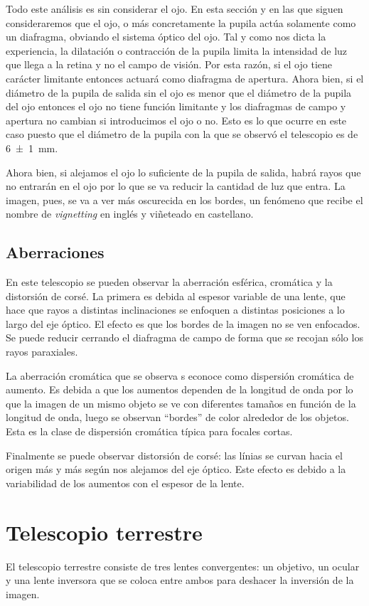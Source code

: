 \documentclass[12pt]{article}
\numberwithin{table}{section}
\numberwithin{figure}{section}
\numberwithin{equation}{section}
\newcommand{\data}[3]{\SI{#1 \pm #2}{#3}}
\begin{document}
Todo este análisis es sin considerar el ojo. En esta sección y en las que siguen consideraremos que el ojo, o más concretamente la pupila actúa solamente como un diafragma, obviando el sistema óptico del ojo. Tal y como nos dicta la experiencia, la dilatación o contracción de la pupila limita la intensidad de luz que llega a la retina y no el campo de visión. Por esta razón, si el ojo tiene carácter limitante entonces actuará como diafragma de apertura. Ahora bien, si el diámetro de la pupila de salida sin el ojo es menor que el diámetro de la pupila del ojo entonces el ojo no tiene función limitante y los diafragmas de campo y apertura no cambian si introducimos el ojo o no. Esto es lo que ocurre en este caso puesto que el diámetro de la pupila con la que se observó el telescopio es de \data{6}{1}{mm}.

Ahora bien, si alejamos el ojo lo suficiente de la pupila de salida, habrá rayos que no entrarán en el ojo por lo que se va reducir la cantidad de luz que entra. La imagen, pues, se va a ver más oscurecida en los bordes, un fenómeno que recibe el nombre de \emph{vignetting} en inglés y viñeteado en castellano. 

\subsection{Aberraciones}
En este telescopio se pueden observar la aberración esférica, cromática y la distorsión de corsé. La primera es debida al espesor variable de una lente, que hace que rayos a distintas inclinaciones se enfoquen a distintas posiciones a lo largo del eje óptico. El efecto es que los bordes de la imagen no se ven enfocados. Se puede reducir cerrando el diafragma de campo de forma que se recojan sólo los rayos paraxiales.

La aberración cromática que se observa s econoce como dispersión cromática de aumento. Es debida a que los aumentos dependen de la longitud de onda por lo que la imagen de un mismo objeto se ve con diferentes tamaños en función de la longitud de onda, luego se observan ``bordes'' de color alrededor de los objetos. Esta es la clase de dispersión cromática típica para focales cortas. 

Finalmente se puede observar distorsión de corsé: las línias se curvan hacia el origen más y más según nos alejamos del eje óptico. Este efecto es debido a la variabilidad de los aumentos con el espesor de la lente.

\section{Telescopio terrestre}
El telescopio terrestre consiste de tres lentes convergentes: un objetivo, un ocular y una lente inversora que se coloca entre ambos para deshacer la inversión de la imagen.  
\end{document}
